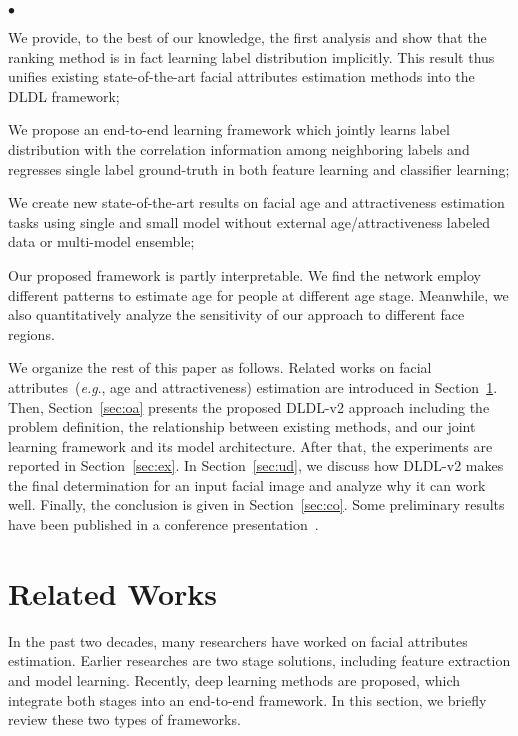 \documentclass[5p,times,twocolumn]{elsarticle}
\makeatletter
\newcommand{\squishlist}{
 \begin{list}{$\bullet$}
  { \setlength{\itemsep}{0pt}
     \setlength{\parsep}{1pt}
     \setlength{\topsep}{1pt}
     \setlength{\partopsep}{0pt}
     \setlength{\leftmargin}{1.5em}
     \setlength{\labelwidth}{1em}
     \setlength{\labelsep}{0.5em} } }
\newcommand{\squishend}{
  \end{list}  }
\DeclareRobustCommand\onedot{\@onedot}
\def\@onedot{.}
\def\eg{\emph{e.g}\onedot}
\makeatother
\begin{document}
\squishlist
 \item We provide, to the best of our knowledge, the first analysis and show that the ranking method is in fact learning label distribution implicitly. This result thus unifies existing state-of-the-art facial attributes estimation methods into the DLDL framework;
 \item We propose an end-to-end learning framework which jointly learns label distribution with the correlation information among neighboring labels and regresses single label ground-truth in both feature learning and classifier learning;
 \item We create new state-of-the-art results on facial age and attractiveness estimation tasks using single and small model without external age/attractiveness labeled data or multi-model ensemble;
 \item Our proposed framework is partly interpretable. We find the network employ different patterns to estimate age for people at different age stage. Meanwhile, we also quantitatively analyze the sensitivity of our approach to different face regions.
\squishend

We organize the rest of this paper as follows. Related works on facial attributes~(\eg, age and attractiveness) estimation are introduced in Section~\ref{sec:rw}. Then, Section~\ref{sec:oa} presents the proposed DLDL-v2 approach including the problem definition, the relationship between existing methods, and our joint learning framework and its model architecture. After that, the experiments are reported in Section~\ref{sec:ex}. In Section~\ref{sec:ud}, we discuss how DLDL-v2 makes the final determination for an input facial image and analyze why it can work well. Finally, the conclusion is given in Section~\ref{sec:co}. Some preliminary results have been published in a conference presentation~\cite{gao2018dldlv2}.

\section{Related Works}\label{sec:rw}
In the past two decades, many researchers have worked on facial attributes estimation. Earlier researches are two stage solutions, including feature extraction and model learning. Recently, deep learning methods are proposed, which integrate both stages into an end-to-end framework. In this section, we briefly review these two types of frameworks.
\end{document}
